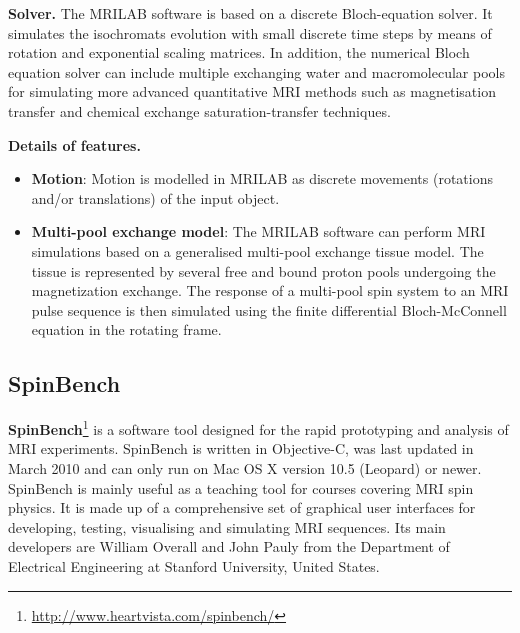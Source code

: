 \hfill

\textbf{Solver.} The MRILAB software is based on a discrete Bloch-equation solver.
It simulates the isochromats evolution with small discrete time steps by means of rotation and exponential scaling matrices. 
In addition, the numerical Bloch equation solver can include multiple exchanging water and macromolecular pools for simulating more advanced quantitative MRI methods such as magnetisation transfer and chemical exchange saturation-transfer techniques.

\hfill

\textbf{Details of features.}
\begin{itemize}
    
    \item \textbf{Motion}: Motion is modelled in MRILAB as discrete movements (rotations and/or translations) of the input object.
    
    \item \textbf{Multi-pool exchange model}: The MRILAB software can perform MRI simulations based on a generalised multi-pool exchange tissue model. 
    The tissue is represented by several free and bound proton pools undergoing the magnetization exchange.
    The response of a multi-pool spin system to an MRI pulse sequence is then simulated using the finite differential Bloch-McConnell equation in the rotating frame.
    
\end{itemize}

\hfill

\subsection{SpinBench}
\textbf{SpinBench}\footnote{\url{http://www.heartvista.com/spinbench/}} is a software tool designed for the rapid prototyping and analysis of MRI experiments.
SpinBench is written in Objective-C, was last updated in March 2010 and can only run on Mac OS X version 10.5 (Leopard) or newer.
SpinBench is mainly useful as a teaching tool for courses covering MRI spin physics.
It is made up of a comprehensive set of graphical user interfaces for developing, testing, visualising and simulating MRI sequences. 
Its main developers are William Overall and John Pauly from the Department of Electrical Engineering at Stanford University, United States.

